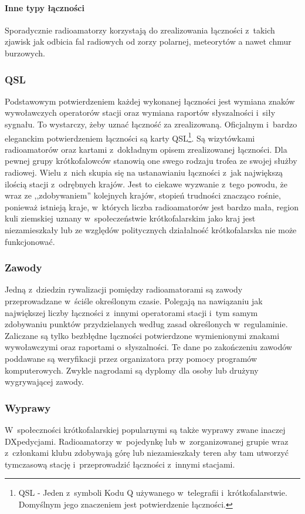 \documentclass[eng,oneside]{mgr}
\begin{document}
					\paragraph{Inne typy łączności}
					Sporadycznie radioamatorzy korzystają do zrealizowania łączności z~takich zjawisk jak odbicia fal radiowych od zorzy polarnej, meteorytów a nawet chmur burzowych.

				\subsubsection{QSL}
				Podstawowym potwierdzeniem każdej wykonanej łączności jest wymiana znaków wywoławczych operatorów stacji oraz wymiana raportów słyszalności i~siły sygnału. To wystarczy, żeby uznać łączność za zrealizowaną. Oficjalnym i~bardzo eleganckim potwierdzeniem łączności są karty QSL\footnote{QSL - Jeden z~symboli Kodu Q używanego w~telegrafii i~krótkofalarstwie. Domyślnym jego znaczeniem jest potwierdzenie łączności.}. Są wizytówkami radioamatorów oraz kartami z~dokładnym opisem zrealizowanej łączności. Dla pewnej grupy krótkofalowców stanowią one swego rodzaju trofea ze swojej służby radiowej. Wielu z~nich skupia się na ustanawianiu łączności z~jak największą ilością stacji z~odrębnych krajów. Jest to ciekawe wyzwanie z~tego powodu, że wraz ze ,,zdobywaniem'' kolejnych krajów, stopień trudności znacząco rośnie, ponieważ istnieją kraje, w~których liczba radioamatorów jest bardzo mała, region kuli ziemskiej uznany w~społeczeństwie krótkofalarskim jako kraj jest niezamieszkały lub ze względów politycznych działalność krótkofalarska nie może funkcjonować.
				\subsubsection{Zawody}
				Jedną z~dziedzin rywalizacji pomiędzy radioamatorami są zawody przeprowadzane w~ściśle określonym czasie. Polegają na nawiązaniu jak największej liczby łączności z~innymi operatorami stacji i~tym samym zdobywaniu punktów przydzielanych według zasad określonych w~regulaminie. Zaliczane są tylko bezbłędne łączności potwierdzone wymienionymi znakami wywoławczymi oraz raportami o~słyszalności. Te dane po zakończeniu zawodów poddawane są weryfikacji przez organizatora przy pomocy programów komputerowych. Zwykle nagrodami są dyplomy dla osoby lub drużyny wygrywającej zawody.

				\subsubsection{Wyprawy}
				W~społeczności krótkofalarskiej popularnymi są także wyprawy zwane inaczej DXpedycjami. Radioamatorzy w~pojedynkę lub w~zorganizowanej grupie wraz z~członkami klubu zdobywają górę lub niezamieszkały teren aby tam utworzyć tymczasową stację i~przeprowadzić łączności z~innymi stacjami.
\end{document}
